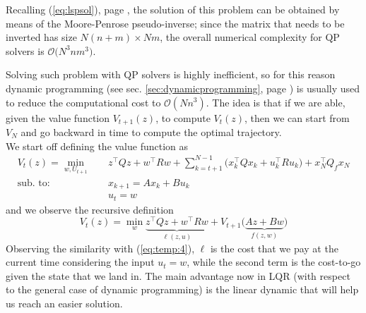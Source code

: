 	Recalling (\ref{eq:lspsol}), page \pageref{eq:lspsol}, the solution of this problem can be obtained by means of the Moore-Penrose pseudo-inverse; since the matrix that needs to be inverted has size $N(n+m) \times Nm$, the overall numerical complexity for QP solvers is $\mathcal O\big(N^3 nm^3\big)$.
	
	Solving such problem with QP solvers is highly inefficient, so for this reason dynamic programming (see sec. \ref{sec:dynamicprogramming}, page \pageref{sec:dynamicprogramming}) is usually used to reduce the computational cost to $\mathcal O(Nn^3)$. The idea is that if we are able, given the value function $V_{t+1}(z)$, to compute $V_t(z)$, then we can start from $V_N$ and go backward in time to compute the optimal trajectory.\\
	We start off defining the value function as
	\begin{align*}
		V_t(z) = \min_{w, U_{t+1}}\quad & z^\top  Q z + w^\top Rw + \sum_{k=t+1}^{N-1} \Big( x_k^\top  Q x_k + u_k^\top  R u_k \Big) + x_N^\top  Q_f x_N \\
		\textrm{sub. to:} \quad & x_{k+1} = Ax_k + B u_k \\ & u_t = w
	\end{align*}
	and we observe the recursive definition
	\begin{equation} \label{eq:LQRvaluefunction}
		V_t(z) = \min_w \underbrace{z^\top Qz + w^\top Rw}_{\ell(z,u)} + V_{t+1}\big(\underbrace{Az+Bw}_{f(z,w)}\big)
	\end{equation}
	Observing the similarity with (\ref{eq:temp:4}), $\ell$ is the cost that we pay at the current time considering the input $u_t = w$, while the second term is the cost-to-go given the state that we land in. The main advantage now in LQR (with respect to the general case of dynamic programming) is the linear dynamic that will help us reach an easier solution. 
	
